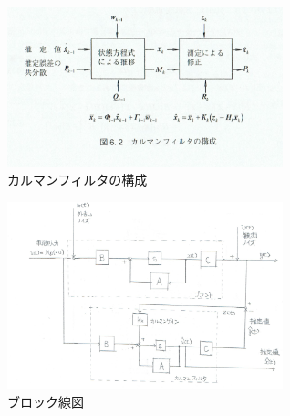 \documentclass[class=article, crop=false, dvipdfmx, fleqn]{standalone}
\begin{document}
\begin{enumerate}
  \begin{figure}[H]
    \begin{center}
    \includegraphics[width=8cm]{../images/kalman_system.png}
    \caption{カルマンフィルタの構成}
    \label{kalman_system}
  \end{center}
  \end{figure}

  \begin{figure}[H]
    \begin{center}
    \includegraphics[width=8cm]{../images/kalman_block.png}
    \caption{ブロック線図}
    \label{kalman_block}
  \end{center}
  \end{figure}

\end{enumerate}
\end{document}
